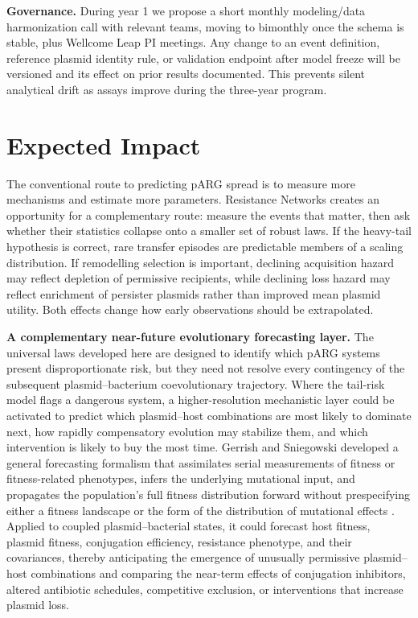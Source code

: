 \documentclass[12pt,a4paper]{article}
\begin{document}
\textbf{Governance.} During year 1 we propose a short monthly modeling/data harmonization call with relevant teams, moving to bimonthly once the schema is stable, plus Wellcome Leap PI meetings. Any change to an event definition, reference plasmid identity rule, or validation endpoint after model freeze will be versioned and its effect on prior results documented. This prevents silent analytical drift as assays improve during the three-year program.

\section{Expected Impact}

The conventional route to predicting pARG spread is to measure more mechanisms and estimate more parameters. Resistance Networks creates an opportunity for a complementary route: measure the events that matter, then ask whether their statistics collapse onto a smaller set of robust laws. If the heavy-tail hypothesis is correct, rare transfer episodes are predictable members of a scaling distribution. If remodelling selection is important, declining acquisition hazard may reflect depletion of permissive recipients, while declining loss hazard may reflect enrichment of persister plasmids rather than improved mean plasmid utility. Both effects change how early observations should be extrapolated.

\textbf{A complementary near-future evolutionary forecasting layer.} The universal laws developed here are designed to identify which pARG systems present disproportionate risk, but they need not resolve every contingency of the subsequent plasmid--bacterium coevolutionary trajectory. Where the tail-risk model flags a dangerous system, a higher-resolution mechanistic layer could be activated to predict which plasmid--host combinations are most likely to dominate next, how rapidly compensatory evolution may stabilize them, and which intervention is likely to buy the most time. Gerrish and Sniegowski developed a general forecasting formalism that assimilates serial measurements of fitness or fitness-related phenotypes, infers the underlying mutational input, and propagates the population's full fitness distribution forward without prespecifying either a fitness landscape or the form of the distribution of mutational effects \citep{gerrish2012}. Applied to coupled plasmid--bacterial states, it could forecast host fitness, plasmid fitness, conjugation efficiency, resistance phenotype, and their covariances, thereby anticipating the emergence of unusually permissive plasmid--host combinations and comparing the near-term effects of conjugation inhibitors, altered antibiotic schedules, competitive exclusion, or interventions that increase plasmid loss.
\end{document}
